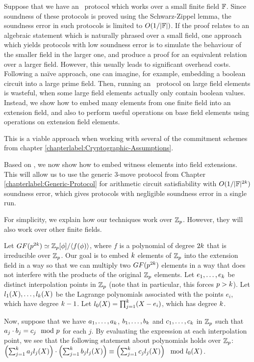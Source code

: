 {Suppose that we have an \ILC\ protocol which works over a small finite field $\mathbb{F}$. Since soundness of these protocols is proved using the Schwarz-Zippel lemma, the soundness error in such protocols is limited to $O(1 / |\mathbb{F}|)$. If the proof relates to an algebraic statement which is naturally phrased over a small field, one approach which yields protocols with low soundness error is to simulate the behaviour of the smaller field in the larger one, and produce a proof for an equivalent relation over a larger field. However, this usually leads to significant overhead costs. Following a na\"{i}ve approach, one can imagine, for example, embedding a boolean circuit into a large prime field. Then, running an \ILC\ protocol on large field elements is wasteful, when some large field elements actually only contain boolean values. Instead, we show how to embed many elements from one finite field into an extension field, and also to perform useful operations on base field elements using operations on extension field elements.

This is a viable approach when working with several of the commitment schemes from chapter \ref{chapterlabel:Cryptographic-Assumptions}.

Based on \cite{BaumBCPGL18}, we now show how to embed witness elements into field extensions. This will allow us to use the generic 3-move protocol from Chapter \ref{chapterlabel:Generic-Protocol} for arithmetic circuit satisfiability with $O(1/|\mathbb{F}|^{2k})$ soundness error, which gives protocols with negligible soundness error in a single run.

For simplicity, we explain how our techniques work over $\mathbb{Z}_p$. However, they will also work over other finite fields.

Let $GF(p^{2k}) \simeq \mathbb{Z}_p[\phi]/\langle f(\phi) \rangle$, where $f$ is a polynomial of degree $2k$ that is irreducible over $\mathbb{Z}_p$. Our goal is to embed $k$ elements of $\mathbb{Z}_p$ into the extension field in a way so that we can multiply two $GF(p^{2k})$ elements in a way that does not interfere with the products of the original $\mathbb{Z}_p$ elements. Let $e_1,\ldots,e_k$ be distinct interpolation points in $\mathbb{Z}_p$ (note that in particular, this forces $p>k$). Let $l_1(X),\ldots,l_k(X)$ be the Lagrange polynomials associated with the points $e_i$, which have degree $k-1$. Let $l_0(X) = \prod_{j=1}^k (X-e_i)$, which has degree $k$.

Now, suppose that we have $a_1,\ldots,a_k$, $b_1,\ldots,b_k$ and $c_1,\ldots,c_k$ in $\mathbb{Z}_p$ such that $a_j \cdot b_j = c_j \mod {p}$ for each $j$. By evaluating the expression at each interpolation point, we see that the following statement about polynomials holds over $\mathbb{Z}_p$: $ \left( \sum_{j=1}^k a_j l_j(X) \right) \cdot \left( \sum_{j=1}^k b_j l_j(X) \right) \equiv \left( \sum_{j=1}^k c_j l_j(X) \right) \mod l_0(X)$.

}
